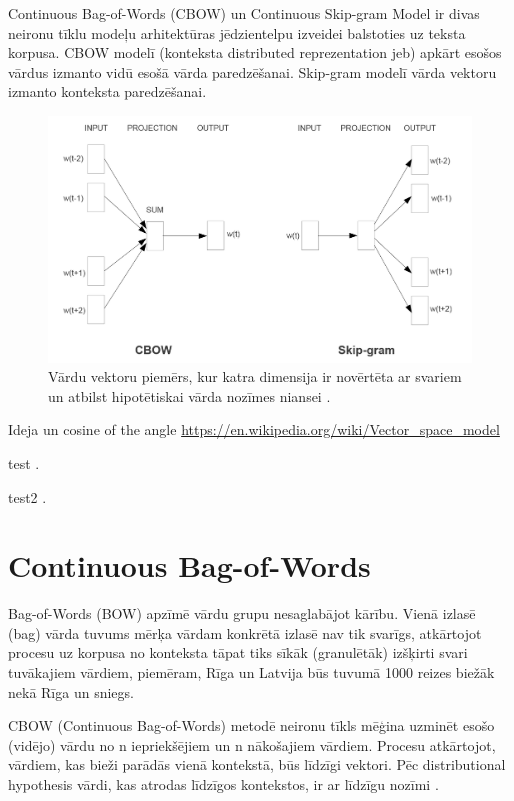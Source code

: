 Continuous Bag-of-Words (CBOW) un Continuous Skip-gram Model ir divas neironu tīklu modeļu arhitektūras jēdzientelpu izveidei balstoties uz teksta korpusa. CBOW modelī (konteksta distributed reprezentation jeb) apkārt esošos vārdus izmanto vidū esošā vārda paredzēšanai. Skip-gram modelī vārda vektoru izmanto konteksta paredzēšanai.

\begin{figure}[h]
	\centering
	\includegraphics[width=\textwidth]{figures/word2vec-models.png}
	\caption{Vārdu vektoru piemērs, kur katra dimensija ir novērtēta ar svariem un atbilst hipotētiskai vārda nozīmes niansei \cite{word2vec2013}.}
	\label{fig:cbow-skipgram}
\end{figure}



Ideja un cosine of the angle
\url{https://en.wikipedia.org/wiki/Vector_space_model}

test
\cite{word2vec2013}.

test2 \cite{mikolov2013exploiting}.


\section{Continuous Bag-of-Words}

Bag-of-Words (BOW) apzīmē vārdu grupu nesaglabājot kārību. Vienā izlasē (bag) vārda tuvums mērķa vārdam konkrētā izlasē nav tik svarīgs, atkārtojot procesu uz korpusa no konteksta tāpat tiks sīkāk (granulētāk) izšķirti svari tuvākajiem vārdiem, piemēram, Rīga un Latvija būs tuvumā 1000 reizes biežāk nekā Rīga un sniegs.

CBOW (Continuous Bag-of-Words) metodē neironu tīkls mēģina uzminēt esošo (vidējo) vārdu no n iepriekšējiem un n nākošajiem vārdiem. Procesu atkārtojot, vārdiem, kas bieži parādās vienā kontekstā, būs līdzīgi vektori. Pēc distributional hypothesis vārdi, kas atrodas līdzīgos kontekstos, ir ar līdzīgu nozīmi \cite{word2vec2013}.



